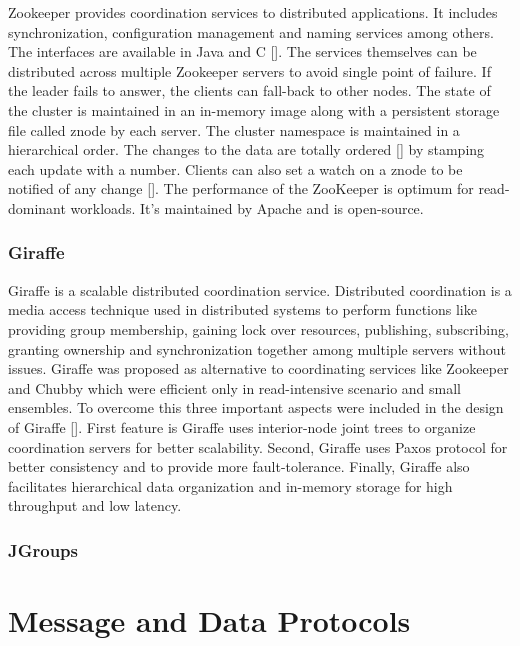 Zookeeper provides coordination services to distributed applications.
It includes synchronization, configuration management and naming
services among others. The interfaces are available in Java and
C [\cite{www-zoo-overiew}]. The services themselves can be distributed
across multiple Zookeeper servers to avoid single point of failure.
If the leader fails to answer, the clients can fall-back to other
nodes. The state of the cluster is maintained in an in-memory image
along with a persistent storage file called znode by each server. The
cluster namespace is maintained in a hierarchical order. The changes
to the data are totally ordered [\cite{www-zoo-wiki}] by stamping each
update with a number. Clients can also set a watch on a znode to be
notified of any change [\cite{www-zoo-ibm}]. The performance of the
ZooKeeper is optimum for read-dominant workloads. It's maintained by
Apache and is open-source.

\subsubsection{Giraffe}

Giraffe is a scalable distributed coordination service. Distributed
coordination is a media access technique used in distributed systems
to perform functions like providing group membership, gaining lock
over resources, publishing, subscribing, granting ownership and
synchronization together among multiple servers without
issues. Giraffe was proposed as alternative to coordinating services
like Zookeeper and Chubby which were efficient only in read-intensive
scenario and small ensembles. To overcome this three important aspects
were included in the design of Giraffe [\cite{giraffePaper}]. First
feature is Giraffe uses interior-node joint trees to organize
coordination servers for better scalability. Second, Giraffe uses
Paxos protocol for better consistency and to provide more
fault-tolerance. Finally, Giraffe also facilitates hierarchical data
organization and in-memory storage for high throughput and low
latency.
     
\subsubsection{JGroups}

\section{Message and Data Protocols}
\label{S:o-protocols}

